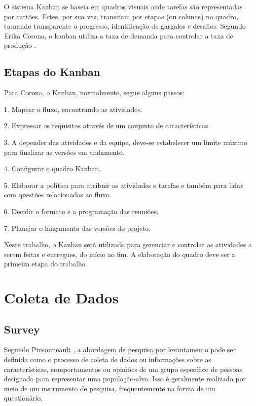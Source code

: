 O sistema Kanban se baseia em quadros visuais onde tarefas são representadas por cartões. Estes, por sua vez, transitam por etapas (ou colunas) no quadro, tornando transparente o progresso, identificação de gargalos e desafios. Segundo Erika Corona, o kanban utiliza a taxa de demanda para controlar a taxa de produção \cite{corona2013review}.

\subsection{Etapas do Kanban}

Para Corona\cite{corona2013review}, o Kanban, normalmente, segue alguns passos:

1. Mapear o fluxo, encontrando as atividades.

2. Expressar os requisitos através de um conjunto de características.

3. A depender das atividades e da equipe, deve-se estabelecer um limite máximo para finalizar as versões em andamento.

4. Configurar o quadro Kanban.

5. Elaborar a política para atribuir as atividades e tarefas e também para lidar com questões relacionadas ao fluxo.

6. Decidir o formato e a programação das reuniões.

7. Planejar o lançamento das versões do projeto.

Neste trabalho, o Kanban será utilizado para gerenciar e controlar as atividades a serem feitas e entregues, do início ao fim. A elaboração do quadro deve ser a primeira etapa do trabalho.

\section{Coleta de Dados}

\subsection{Survey}

Segundo Pinsonneault \cite{pinsonneault1993survey}, a abordagem de pesquisa por levantamento pode ser definida como o processo de coleta de dados ou informações sobre as características, comportamentos ou opiniões de um grupo específico de pessoas designado para representar uma população-alvo. Isso é geralmente realizado por meio de um instrumento de pesquisa, frequentemente na forma de um questionário.


